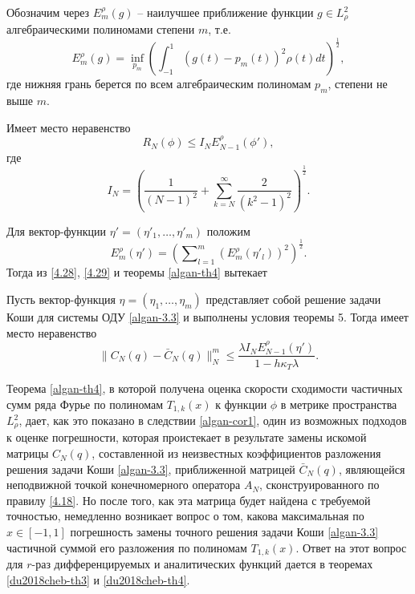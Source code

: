 Обозначим через $E^\rho_ m(g)$ -- наилучшее приближение функции $g\in L^2_\rho$ алгебраическими полиномами степени $m$, т.е.
$$
 E^\rho_ m(g)=\inf_{p_m}\left(\int_{-1}^1(g(t)- p_m(t))^2 \rho(t)dt\right)^\frac12,
$$
где нижняя грань берется по всем алгебраическим полиномам $p_m$, степени не выше $m$.

\begin{theorem}\label{algan-th4}
     Имеет место  неравенство
$$
R_N(\phi)\le I_NE^\rho_ {N-1}(\phi'),
$$
где
$$
I_N=\left(\frac{1}{(N-1)^2}+\sum_{k=N}^{\infty}\frac{2}{(k^2-1)^2}\right)^\frac12.
 $$
\end{theorem}

Для вектор-функции $\eta'=(\eta'_1,\ldots,\eta'_m)$ положим
$$
E^\rho_ m(\eta')=\left(\sum\nolimits_{l=1}^m (E^\rho_ m(\eta'_l))^2\right)^\frac12.
$$
Тогда из \eqref{4.28}, \eqref{4.29} и теоремы \ref{algan-th4} вытекает
\begin{corollary}\label{algan-cor1}
  Пусть вектор-функция $\eta=(\eta_1,\ldots,\eta_m)$ представляет собой решение задачи Коши для системы ОДУ \eqref{algan-3.3} и выполнены условия теоремы 5. Тогда имеет место неравенство
$$
\|C_N(q)-\bar C_N(q)\|_N^m\le \frac{\lambda I_NE^\rho_{N-1}(\eta') }{1-h\kappa_T\lambda}.
$$
  \end{corollary}

Теорема \ref{algan-th4}, в которой получена оценка скорости сходимости частичных сумм  ряда Фурье по полиномам  $T_{1,k}(x)$ к функции $\phi$ в метрике пространства $L^2_\rho$, дает, как это показано в следствии \ref{algan-cor1}, один из возможных подходов к оценке погрешности, которая проистекает в результате замены искомой матрицы $C_N(q)$, составленной из неизвестных коэффициентов  разложения решения задачи Коши \eqref{algan-3.3}, приближенной матрицей $\bar C_N(q)$, являющейся неподвижной точкой конечномерного оператора $A_N$, сконструированного по правилу \eqref{4.18}. Но после того, как эта матрица будет  найдена с требуемой точностью, немедленно возникает вопрос о том, какова максимальная по $x\in[-1,1]$ погрешность замены точного решения  задачи Коши \eqref{algan-3.3} частичной суммой его разложения по полиномам $T_{1,k}(x)$. Ответ на этот вопрос для $r$-раз дифференцируемых и аналитических функций дается в теоремах \ref{du2018cheb-th3} и \ref{du2018cheb-th4}. 
